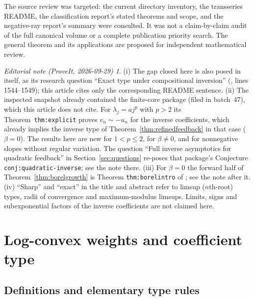 \documentclass[11pt,a4paper]{article}
\numberwithin{equation}{section}
\theoremstyle{definition}
\theoremstyle{remark}
\newtheorem*{ednote}{Editorial note (ProveIt, 2026-09-29)}
\begin{document}
The source review was targeted: the current directory inventory, the
transseries README, the classification report's stated theorems and scope,
and the negative-ray report's summary were consulted. It was not a
claim-by-claim audit of the full canonical volume or a complete publication
priority search. The general theorem and its applications are proposed for
independent mathematical review.

\begin{ednote}
(i) The gap closed here is also posed in \cite{feedback} itself, as its
research question ``Exact type under compositional inversion''
(,
lines 1544--1549); this article cites only the corresponding README
sentence. (ii) The inspected snapshot already contained the finite-core
package \cite{ed:fcu} (filed in batch~47), which this article does not
cite. For $\lambda_j=aj^p$ with $p>2$ its Theorem~\texttt{thm:explicit}
proves $v_n\sim-u_n$ for the inverse coefficients, which already implies
the inverse type of Theorem~\ref{thm:refinedfeedback} in that case
($\beta=0$). The results here are new for $1<p\le2$, for $\beta\ne0$, and
for nonnegative slopes without regular variation. The question
``Full inverse asymptotics for quadratic feedback'' in
Section~\ref{sec:questions} re-poses that package's Conjecture
\texttt{conj:quadratic-inverse}; see the note there. (iii) For $\beta=0$
the forward half of Theorem~\ref{thm:borelgrowth} is Theorem
\texttt{thm:borelintro} of \cite{feedback}; see the note after it.
(iv) ``Sharp'' and ``exact'' in the title and abstract refer to limsup
($n$th-root) types, radii of convergence and maximum-modulus limsups.
Limits, signs and subexponential factors of the inverse coefficients are
not claimed here.
\end{ednote}

\section{Log-convex weights and coefficient type}
\label{sec:weights}

\subsection{Definitions and elementary type rules}
\end{document}
